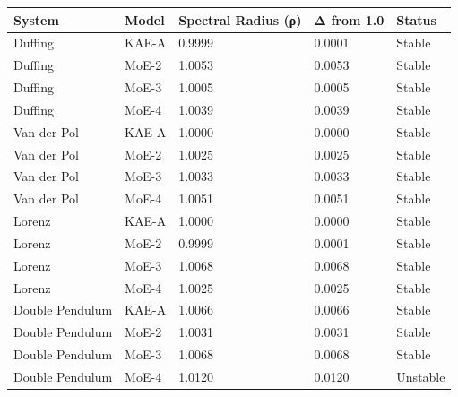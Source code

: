 \begin{tabular}{lllll}
\toprule
System & Model & Spectral Radius (ρ) & Δ from 1.0 & Status \\
\midrule
Duffing & KAE-A & 0.9999 & 0.0001 & Stable \\
Duffing & MoE-2 & 1.0053 & 0.0053 & Stable \\
Duffing & MoE-3 & 1.0005 & 0.0005 & Stable \\
Duffing & MoE-4 & 1.0039 & 0.0039 & Stable \\
Van der Pol & KAE-A & 1.0000 & 0.0000 & Stable \\
Van der Pol & MoE-2 & 1.0025 & 0.0025 & Stable \\
Van der Pol & MoE-3 & 1.0033 & 0.0033 & Stable \\
Van der Pol & MoE-4 & 1.0051 & 0.0051 & Stable \\
Lorenz & KAE-A & 1.0000 & 0.0000 & Stable \\
Lorenz & MoE-2 & 0.9999 & 0.0001 & Stable \\
Lorenz & MoE-3 & 1.0068 & 0.0068 & Stable \\
Lorenz & MoE-4 & 1.0025 & 0.0025 & Stable \\
Double Pendulum & KAE-A & 1.0066 & 0.0066 & Stable \\
Double Pendulum & MoE-2 & 1.0031 & 0.0031 & Stable \\
Double Pendulum & MoE-3 & 1.0068 & 0.0068 & Stable \\
Double Pendulum & MoE-4 & 1.0120 & 0.0120 & Unstable \\
\bottomrule
\end{tabular}

